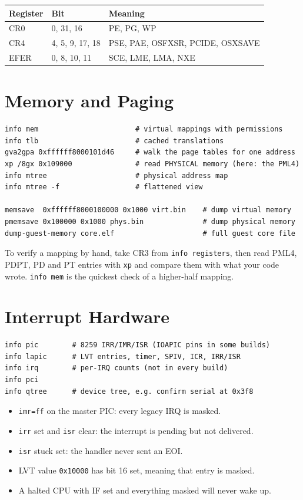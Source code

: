 \documentclass[11pt,a4paper]{article}
\newcommand{\cmd}[1]{\texttt{#1}}
\begin{document}
\begin{center}
\begin{tabular}{@{}lll@{}}
\toprule
Register & Bit & Meaning \\
\midrule
CR0   & 0, 31, 16 & PE, PG, WP \\
CR4   & 4, 5, 9, 17, 18 & PSE, PAE, OSFXSR, PCIDE, OSXSAVE \\
EFER  & 0, 8, 10, 11 & SCE, LME, LMA, NXE \\
\bottomrule
\end{tabular}
\end{center}
\section{Memory and Paging}

\begin{lstlisting}
info mem                       # virtual mappings with permissions
info tlb                       # cached translations
gva2gpa 0xffffff8000101d46     # walk the page tables for one address
xp /8gx 0x109000               # read PHYSICAL memory (here: the PML4)
info mtree                     # physical address map
info mtree -f                  # flattened view

memsave  0xffffff8000100000 0x1000 virt.bin    # dump virtual memory
pmemsave 0x100000 0x1000 phys.bin              # dump physical memory
dump-guest-memory core.elf                     # full guest core file
\end{lstlisting}

To verify a mapping by hand, take CR3 from \cmd{info registers}, then read
PML4, PDPT, PD and PT entries with \cmd{xp} and compare them with what your
code wrote. \cmd{info mem} is the quickest check of a higher-half mapping.
\section{Interrupt Hardware}

\begin{lstlisting}
info pic        # 8259 IRR/IMR/ISR (IOAPIC pins in some builds)
info lapic      # LVT entries, timer, SPIV, ICR, IRR/ISR
info irq        # per-IRQ counts (not in every build)
info pci
info qtree      # device tree, e.g. confirm serial at 0x3f8
\end{lstlisting}

\begin{itemize}
  \item \cmd{imr=ff} on the master PIC: every legacy IRQ is masked.
  \item \cmd{irr} set and \cmd{isr} clear: the interrupt is pending but not delivered.
  \item \cmd{isr} stuck set: the handler never sent an EOI.
  \item LVT value \cmd{0x10000} has bit 16 set, meaning that entry is masked.
  \item A halted CPU with IF set and everything masked will never wake up.
\end{itemize}
\end{document}
